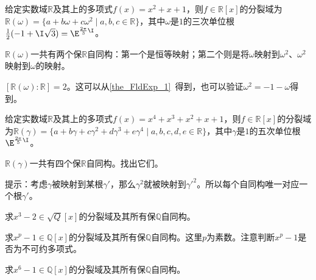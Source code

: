 \begin{example}{}
给定实数域$\mathbb{R}$及其上的多项式$f(x)=x^2+x+1$，则$f\in\mathbb{R}[x]$的分裂域为$\mathbb{R}(\omega)=\{a+b\omega+c\omega^2 \mid a, b, c\in\mathbb{R}\}$，其中$\omega$是$1$的三次单位根$\frac{1}{2}(-1+\I\sqrt{3})=\E^{\frac{2\pi}{3}\I}$。

$\mathbb{R}(\omega)$一共有两个保$\mathbb{R}$自同构：第一个是恒等映射；第二个则是将$\omega$映射到$\omega^2$、$\omega^2$映射到$\omega$的映射。

$[\mathbb{R}(\omega):\mathbb{R}]=2$。这可以从\autoref{the_FldExp_1}~得到，也可以验证$\omega^2=-1-\omega$得到。
\end{example}



\begin{exercise}{}
给定实数域$\mathbb{R}$及其上的多项式$f(x)=x^4+x^3+x^2+x+1$，则$f\in\mathbb{R}[x]$的分裂域为$\mathbb{R}(\gamma)=\{a+b\gamma+c\gamma^2+d\gamma^3+e\gamma^4 \mid a, b, c, d, e\in\mathbb{R}\}$，其中$\gamma$是$1$的五次单位根$\E^{\frac{2\pi}{5}\I}$。

$\mathbb{R}(\gamma)$一共有四个保$\mathbb{R}$自同构。找出它们。

提示：考虑$\gamma$被映射到某根$\gamma'$，那么$\gamma^2$就被映射到$\gamma'^2$。所以每个自同构唯一对应一个根$\gamma'$。
\end{exercise}



\begin{exercise}{}\label{exe_SpltFd_1}
求$x^3-2\in\sqrt{Q}[x]$的分裂域及其所有保$\mathbb{Q}$自同构。
\end{exercise}



\begin{exercise}{}
求$x^p-1\in\mathbb{Q}[x]$的分裂域及其所有保$\mathbb{Q}$自同构。这里$p$为素数。注意判断$x^p-1$是否为不可约多项式。
\end{exercise}


\begin{exercise}{}
求$x^6-1\in\mathbb{Q}[x]$的分裂域及其所有保$\mathbb{Q}$自同构。
\end{exercise}















